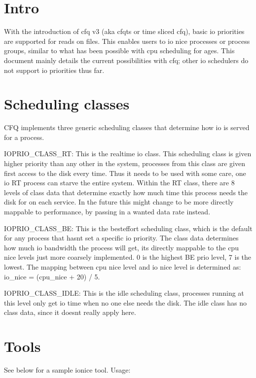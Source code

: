 \documentclass[a4paper,11pt,english]{sphinxmanual}
\begin{document}
\section{Intro}
\label{\detokenize{ioprio:intro}}
With the introduction of cfq v3 (aka cfq\sphinxhyphen{}ts or time sliced cfq), basic io
priorities are supported for reads on files.  This enables users to io nice
processes or process groups, similar to what has been possible with cpu
scheduling for ages.  This document mainly details the current possibilities
with cfq; other io schedulers do not support io priorities thus far.


\section{Scheduling classes}
\label{\detokenize{ioprio:scheduling-classes}}
CFQ implements three generic scheduling classes that determine how io is
served for a process.

IOPRIO\_CLASS\_RT: This is the realtime io class. This scheduling class is given
higher priority than any other in the system, processes from this class are
given first access to the disk every time. Thus it needs to be used with some
care, one io RT process can starve the entire system. Within the RT class,
there are 8 levels of class data that determine exactly how much time this
process needs the disk for on each service. In the future this might change
to be more directly mappable to performance, by passing in a wanted data
rate instead.

IOPRIO\_CLASS\_BE: This is the best\sphinxhyphen{}effort scheduling class, which is the default
for any process that hasn\textquotesingle{}t set a specific io priority. The class data
determines how much io bandwidth the process will get, it\textquotesingle{}s directly mappable
to the cpu nice levels just more coarsely implemented. 0 is the highest
BE prio level, 7 is the lowest. The mapping between cpu nice level and io
nice level is determined as: io\_nice = (cpu\_nice + 20) / 5.

IOPRIO\_CLASS\_IDLE: This is the idle scheduling class, processes running at this
level only get io time when no one else needs the disk. The idle class has no
class data, since it doesn\textquotesingle{}t really apply here.


\section{Tools}
\label{\detokenize{ioprio:tools}}
See below for a sample ionice tool. Usage:
\end{document}
